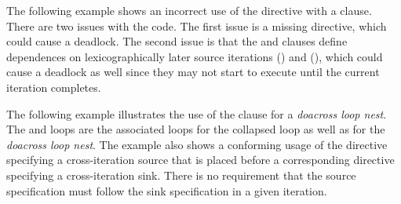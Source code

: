 


The following example shows an incorrect use of the 
directive with a  clause.  There are two issues with the code.  
The first issue is a missing  directive,
which could cause a deadlock.  
The second issue is that the  and  
clauses define dependences on lexicographically later 
source iterations () and (), which could cause 
a deadlock as well since they may not start to execute until the current iteration completes.




The following example illustrates the use of the  clause for
a \emph{doacross loop nest}.  The  and  loops are the associated
loops for the collapsed loop as well as for the \emph{doacross loop nest}.
The example also shows a conforming usage of the  directive specifying a cross-iteration source
that is placed before a corresponding  directive specifying a
cross-iteration sink. There is no requirement that the source specification
must follow the sink specification in a given iteration.


